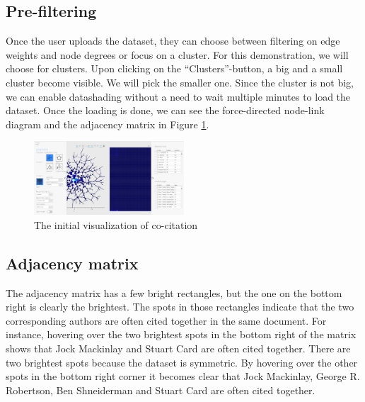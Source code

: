 \documentclass[journal]{vgtc}                %
\begin{document}
\subsection{Pre-filtering}
Once the user uploads the dataset, they can choose between filtering on edge weights and node degrees or focus on a cluster. For this demonstration, we will choose for clusters. Upon clicking on the ``Clusters''-button, a big and a small cluster become visible. We will pick the smaller one.
Since the cluster is not big, we can enable datashading without a need to wait multiple minutes to load the dataset. Once the loading is done, we can see the force-directed node-link diagram and the adjacency matrix in Figure \ref{fig:appexaample}.

\begin{figure}[hbt]
    \centering
    \includegraphics[width=0.5\textwidth]{app-example-1.png}
    \caption{The initial visualization of co-citation}
    \label{fig:appexaample}
\end{figure}

\subsection{Adjacency matrix}
The adjacency matrix has a few bright rectangles, but the one on the bottom right is clearly the brightest. The spots in those rectangles indicate that the two corresponding authors are often cited together in the same document. For instance, hovering over the two brightest spots in the bottom right of the matrix shows that Jock Mackinlay and Stuart Card are often cited together. There are two brightest spots because the dataset is symmetric. By hovering over the other spots in the bottom right corner it becomes clear that Jock Mackinlay, George R. Robertson, Ben Shneiderman and Stuart Card are often cited together.
\end{document}

